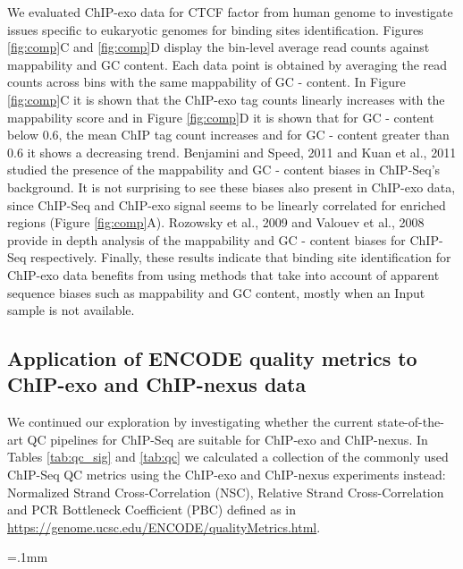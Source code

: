 \documentclass{bmcart}
\begin{document}
We evaluated ChIP-exo data for CTCF factor from human genome
\cite{exo1} to investigate issues specific to eukaryotic genomes for
binding sites identification. Figures \ref{fig:comp}C and
\ref{fig:comp}D display the bin-level average read counts against
mappability and GC content. Each data point is obtained by averaging
the read counts across bins with the same mappability of GC -
content. In Figure \ref{fig:comp}C it is shown that the ChIP-exo tag
counts linearly increases with the mappability score and in Figure
\ref{fig:comp}D it is shown that for GC - content below 0.6, the mean
ChIP tag count increases and for GC - content greater than 0.6 it
shows a decreasing trend. Benjamini and Speed,
2011\nocite{benjamini2011} and Kuan et al., 2011\nocite{mosaics}
studied the presence of the mappability and GC - content biases in
ChIP-Seq's background. It is not surprising to see these biases also
present in ChIP-exo data, since ChIP-Seq and ChIP-exo signal seems to
be linearly correlated for enriched regions (Figure
\ref{fig:comp}A). Rozowsky et al., 2009\nocite{peakseq} and Valouev et
al., 2008\nocite{quest} provide in depth analysis of the mappability
and GC - content biases for ChIP-Seq respectively. Finally, these
results indicate that binding site identification for ChIP-exo data
benefits from using methods that take into account of apparent
sequence biases such as mappability and GC content, mostly when an
Input sample is not available.

\subsection*{Application of ENCODE quality metrics to ChIP-exo and
  ChIP-nexus data}

We continued our exploration by investigating whether the current
state-of-the-art QC pipelines for ChIP-Seq are suitable for ChIP-exo
and ChIP-nexus. In Tables \ref{tab:qc_sig} and \ref{tab:qc} we
calculated a collection of the commonly used ChIP-Seq QC metrics using
the ChIP-exo and ChIP-nexus experiments instead: Normalized Strand
Cross-Correlation (NSC), Relative Strand Cross-Correlation and PCR
Bottleneck Coefficient (PBC) defined as in
\url{https://genome.ucsc.edu/ENCODE/qualityMetrics.html}\nocite{encode_qc}.

\arrayrulewidth=.1mm 
\end{document}
